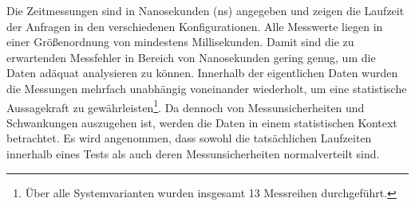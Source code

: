 \begin{table}[!htp]
    \centering
    \caption{Auszug der Daten der Performance-Messung.}
    \label{tab:performance-data}
\end{table}

Die Zeitmessungen sind in Nanosekunden (ns) angegeben und zeigen die Laufzeit der Anfragen in den verschiedenen Konfigurationen.
Alle Messwerte liegen in einer Größenordnung von mindestens Millisekunden.
Damit sind die zu erwartenden Messfehler in Bereich von Nanosekunden gering genug, um die Daten adäquat analysieren zu können.
Innerhalb der eigentlichen Daten wurden die Messungen mehrfach unabhängig voneinander wiederholt, um eine statistische Aussagekraft zu gewährleisten\footnote{Über alle Systemvarianten wurden insgesamt 13 Messreihen durchgeführt.}.
Da dennoch von Messunsicherheiten und Schwankungen auszugehen ist, werden die Daten in einem statistischen Kontext betrachtet.
Es wird angenommen, dass sowohl die tatsächlichen Laufzeiten innerhalb eines Tests als auch deren Messunsicherheiten normalverteilt sind.

